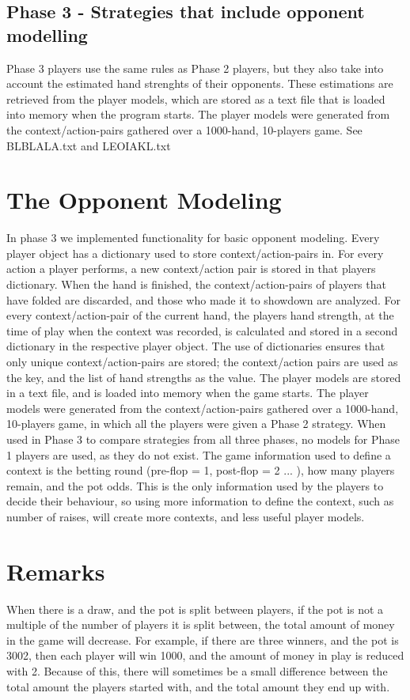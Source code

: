 \documentclass[titlepage]{article}
\begin{document}
\begin{itemize}
	\subsection{Phase 3 - Strategies that include opponent modelling}
		Phase 3 players use the same rules as Phase 2 players, but they also take into account the estimated hand strenghts of their opponents. These estimations are retrieved from the player models, which are stored as a text file that is loaded into memory when the program starts. The player models were generated from the context/action-pairs gathered over a 1000-hand, 10-players game. See BLBLALA.txt and LEOIAKL.txt
		
\section{The Opponent Modeling}
    In phase 3 we implemented functionality for basic opponent modeling. Every player object has a dictionary used to store context/action-pairs in. For every action a player performs, a new context/action pair is stored in that players dictionary. When the hand is finished, the context/action-pairs of players that have folded are discarded, and those who made it to showdown are analyzed. For every context/action-pair of the current hand, the players hand strength, at the time of play when the context was recorded, is calculated and stored in a second dictionary in the respective player object. The use of dictionaries ensures that only unique context/action-pairs are stored; the context/action pairs are used as the key, and the list of hand strengths as the value. The player models are stored in a text file, and is loaded into memory when the game starts. The player models were generated from the context/action-pairs gathered over a 1000-hand, 10-players game, in which all the players were given a Phase 2 strategy. When used in Phase 3 to compare strategies from all three phases, no models for Phase 1 players are used, as they do not exist. The game information used to define a context is the betting round (pre-flop = 1, post-flop = 2 ... ), how many players remain, and the pot odds. This is the only information used by the players to decide their behaviour, so using more information to define the context, such as number of raises, will create more contexts, and less useful player models. 
		
		
\section{Remarks}
    When there is a draw, and the pot is split between players, if the pot is not a multiple of the number of players it is split between, the total amount of money in the game will decrease. For example, if there are three winners, and the pot is 3002, then each player will win 1000, and the amount of money in play is reduced with 2. Because of this, there will sometimes be a small difference between the total amount the players started with, and the total amount they end up with.
    		

\end{itemize}
\end{document}
